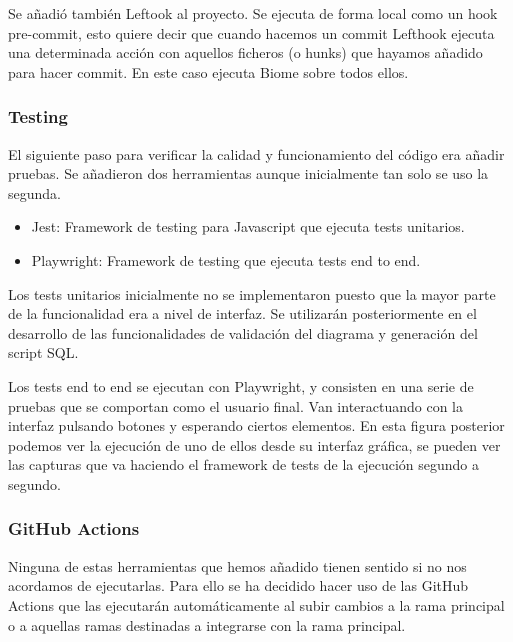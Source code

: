 Se añadió también Leftook al proyecto. Se ejecuta de forma local como un hook pre-commit, esto quiere decir que cuando hacemos un commit Lefthook ejecuta una determinada acción con aquellos ficheros (o hunks) que hayamos añadido para hacer commit. En este caso ejecuta Biome sobre todos ellos.


\subsubsection{Testing}
El siguiente paso para verificar la calidad y funcionamiento del código era añadir pruebas. Se añadieron dos herramientas aunque inicialmente tan solo se uso la segunda.

\begin{itemize}\tightlist
    \item Jest: Framework de testing para Javascript que ejecuta tests unitarios.
    \item Playwright: Framework de testing que ejecuta tests end to end.
\end{itemize}

Los tests unitarios inicialmente no se implementaron puesto que la mayor parte de la funcionalidad era a nivel de interfaz. Se utilizarán posteriormente en el desarrollo de las funcionalidades de validación del diagrama y generación del script SQL.

Los tests end to end se ejecutan con Playwright, y consisten en una serie de pruebas que se comportan como el usuario final. Van interactuando con la interfaz pulsando botones y esperando ciertos elementos.
En esta figura posterior podemos ver la ejecución de uno de ellos desde su interfaz gráfica, se pueden ver las capturas que va haciendo el framework de tests de la ejecución segundo a segundo.

\subsubsection{GitHub Actions}
Ninguna de estas herramientas que hemos añadido tienen sentido si no nos acordamos de ejecutarlas. Para ello se ha decidido hacer uso de las GitHub Actions que las ejecutarán automáticamente al subir cambios a la rama principal o a aquellas ramas destinadas a integrarse con la rama principal.

